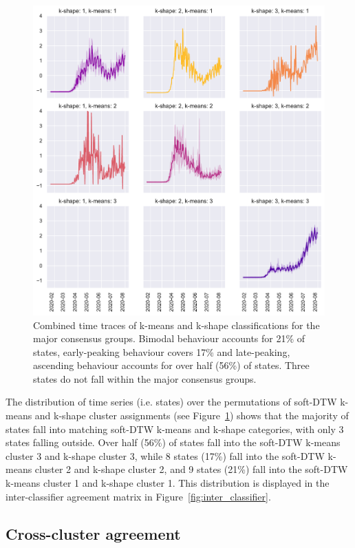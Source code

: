 \documentclass{article}
\begin{document}
\begin{figure}
	\includegraphics[width=0.8\linewidth]{figures/k-combinations}
	\centering
	\caption{Combined time traces of k-means and k-shape classifications for the major consensus groups. Bimodal behaviour accounts for 21\% of states, early-peaking behaviour covers 17\% and late-peaking, ascending behaviour accounts for over half (56\%) of states. Three states do not fall within the major consensus groups.}
	\label{fig:k_combinations}
\end{figure}

The distribution of time series (i.e. states) over the permutations of soft-DTW k-means and k-shape cluster assignments (see Figure~\ref{fig:k_combinations}) shows that the majority of states fall into matching soft-DTW k-means and k-shape categories, with only 3 states falling outside. Over half (56\%) of states fall into the soft-DTW k-means cluster 3 and k-shape cluster 3, while 8 states (17\%) fall into the soft-DTW k-means cluster 2 and k-shape cluster 2, and 9 states (21\%) fall into the soft-DTW k-means cluster 1 and k-shape cluster 1. This distribution is displayed in the inter-classifier agreement matrix in Figure~\ref{fig:inter_classifier}.



\subsection{Cross-cluster agreement} %
\label{sub:cross_cluster_agreement}
\end{document}
